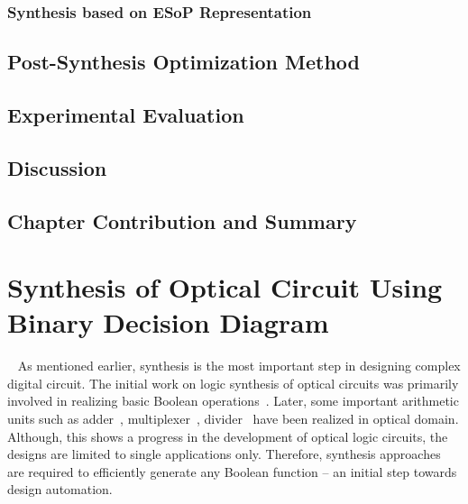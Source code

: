 \documentclass[10pt,letterpaper,twoside,openright]{book}
\begin{document}
\newpage

\subsection{Synthesis based on ESoP Representation}

\newpage

\section{Post-Synthesis Optimization Method}

\newpage

\section{Experimental Evaluation}

\newpage

\section{Discussion}

\newpage

\section{Chapter Contribution and Summary}
\newpage

\chapter{Synthesis of Optical Circuit Using Binary Decision Diagram}~\label{ch:opt-circ-bdd}
As mentioned earlier, synthesis is the most important step in designing complex digital circuit.
The initial work on logic synthesis of optical circuits was primarily involved in realizing basic Boolean operations~\cite{Kim:06,Martinez2007,Taraphdar2010}. Later, some important arithmetic units such as adder~\cite{DattaCS15}, multiplexer~\cite{Datta2014}, divider~\cite{Aikawa2011} have been realized in optical domain. Although, this shows a progress in the development of optical logic circuits, the designs are limited to single applications only. Therefore, synthesis approaches are required to efficiently generate any Boolean function -- an initial step towards design automation.
\end{document}
